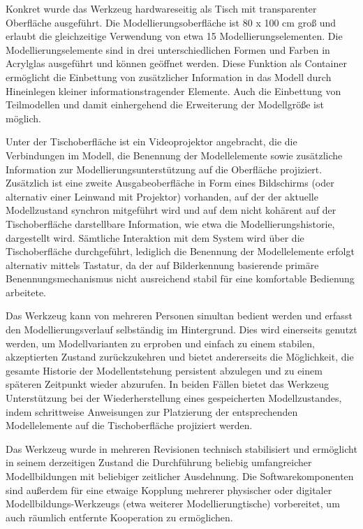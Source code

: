 Konkret wurde das Werkzeug hardwareseitig als Tisch mit transparenter Oberfläche ausgeführt. Die Modellierungsoberfläche ist 80 x 100 cm groß und erlaubt die gleichzeitige Verwendung von etwa 15 Modellierungselementen. Die Modellierungselemente sind in drei unterschiedlichen Formen und Farben in Acrylglas ausgeführt und können geöffnet werden. Diese Funktion als Container ermöglicht die Einbettung von zusätzlicher Information in das Modell durch Hineinlegen kleiner informationstragender Elemente. Auch die Einbettung von Teilmodellen und damit einhergehend die Erweiterung der Modellgröße ist möglich. 

Unter der Tischoberfläche ist ein Videoprojektor angebracht, die die Verbindungen im Modell, die Benennung der Modellelemente sowie zusätzliche Information zur Modellierungsunterstützung auf die Oberfläche projiziert. Zusätzlich ist eine zweite Ausgabeoberfläche in Form eines Bildschirms (oder alternativ einer Leinwand mit Projektor) vorhanden, auf der der aktuelle Modellzustand synchron mitgeführt wird und auf dem nicht kohärent auf der Tischoberfläche darstellbare Information, wie etwa die Modellierungshistorie, dargestellt wird. Sämtliche Interaktion mit dem System wird über die Tischoberfläche durchgeführt, lediglich die Benennung der Modellelemente erfolgt alternativ mittels Tastatur, da der auf Bilderkennung basierende primäre Benennungsmechanismus nicht ausreichend stabil für eine komfortable Bedienung arbeitete.

Das Werkzeug kann von mehreren Personen simultan bedient werden und erfasst den Modellierungsverlauf selbständig im Hintergrund. Dies wird einerseits genutzt werden, um Modellvarianten zu erproben und einfach zu einem stabilen, akzeptierten Zustand zurückzukehren und bietet andererseits die Möglichkeit, die gesamte Historie der Modellentstehung persistent abzulegen und zu einem späteren Zeitpunkt wieder abzurufen. In beiden Fällen bietet das Werkzeug Unterstützung bei der Wiederherstellung eines gespeicherten Modellzustandes, indem schrittweise Anweisungen zur Platzierung der entsprechenden Modellelemente auf die Tischoberfläche projiziert werden.

Das Werkzeug wurde in mehreren Revisionen technisch stabilisiert und ermöglicht in seinem derzeitigen Zustand die Durchführung beliebig umfangreicher Modellbildungen mit beliebiger zeitlicher Ausdehnung. Die Softwarekomponenten sind außerdem für eine etwaige Kopplung mehrerer physischer oder digitaler Modellbildungs-Werkzeugs (etwa weiterer Modellierungtische) vorbereitet, um auch räumlich entfernte Kooperation zu ermöglichen. 

